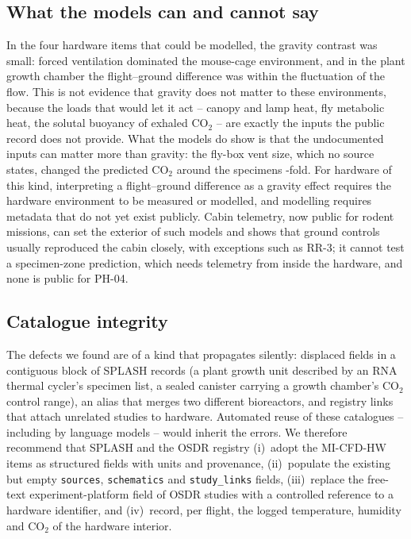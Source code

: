 \documentclass[11pt]{article}
\begin{document}
\subsection{What the models can and cannot say}
In the four hardware items that could be modelled, the gravity contrast was small: forced ventilation
dominated the mouse-cage environment, and in the plant growth chamber the flight--ground difference was
within the fluctuation of the flow. This is not evidence that gravity does not matter to these
environments, because the loads that would let it act -- canopy and lamp heat, fly metabolic heat, the
solutal buoyancy of exhaled CO$_2$ -- are exactly the inputs the public record does not provide. What the
models do show is that the undocumented inputs can matter more than gravity: the fly-box vent size, which
no source states, changed the predicted CO$_2$ around the specimens \hwCfdVfbCoRatio-fold. For hardware of
this kind, interpreting a flight--ground difference as a gravity effect requires the hardware environment
to be measured or modelled, and modelling requires metadata that do not yet exist publicly. Cabin telemetry,
now public for \hwNEdaPaired{} rodent missions, can set the exterior of such models and shows that ground
controls usually reproduced the cabin closely, with exceptions such as RR-3; it cannot test a specimen-zone
prediction, which needs telemetry from inside the hardware, and none is public for PH-04.

\subsection{Catalogue integrity}
The defects we found are of a kind that propagates silently: displaced fields in a contiguous block of
SPLASH records (a plant growth unit described by an RNA thermal cycler's specimen list, a sealed canister
carrying a growth chamber's CO$_2$ control range), an alias that merges two different bioreactors, and
registry links that attach unrelated studies to hardware. Automated reuse of these catalogues -- including
by language models -- would inherit the errors. We therefore recommend that SPLASH and the OSDR registry
(i)~adopt the MI-CFD-HW items as structured fields with units and provenance, (ii)~populate the existing but
empty \texttt{sources}, \texttt{schematics} and \texttt{study\_links} fields, (iii)~replace the free-text
experiment-platform field of OSDR studies with a controlled reference to a hardware identifier, and
(iv)~record, per flight, the logged temperature, humidity and CO$_2$ of the hardware interior.
\end{document}
